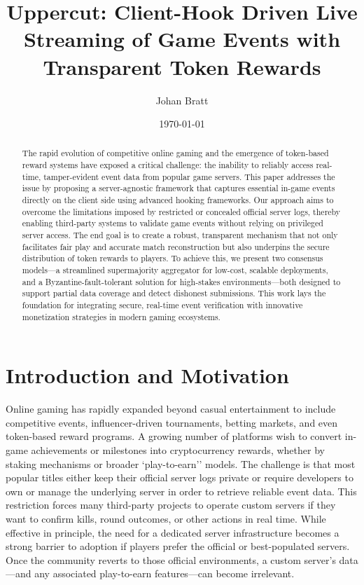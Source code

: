 \documentclass[11pt]{article}
\title{\textbf{Uppercut: Client-Hook Driven Live Streaming of Game Events with Transparent Token Rewards}}
\author{Johan Bratt}
\date{\today}
\begin{document}
\maketitle

\begin{abstract} The rapid evolution of competitive online gaming and the emergence of token-based reward systems have exposed a critical challenge: the inability to reliably access real-time, tamper-evident event data from popular game servers. This paper addresses the issue by proposing a server-agnostic framework that captures essential in-game events directly on the client side using advanced hooking frameworks. Our approach aims to overcome the limitations imposed by restricted or concealed official server logs, thereby enabling third-party systems to validate game events without relying on privileged server access. The end goal is to create a robust, transparent mechanism that not only facilitates fair play and accurate match reconstruction but also underpins the secure distribution of token rewards to players. To achieve this, we present two consensus models—a streamlined supermajority aggregator for low-cost, scalable deployments, and a Byzantine-fault-tolerant solution for high-stakes environments—both designed to support partial data coverage and detect dishonest submissions. This work lays the foundation for integrating secure, real-time event verification with innovative monetization strategies in modern gaming ecosystems.
\end{abstract}


\section{Introduction and Motivation}
\label{sec:intro}

Online gaming has rapidly expanded beyond casual entertainment to include competitive events, influencer-driven tournaments, betting markets, and even token-based reward programs. A growing number of platforms wish to convert in-game achievements or milestones into cryptocurrency    rewards\cite{erc1155}, whether by staking mechanisms or broader `play-to-earn''\cite{sahin2023} models. The challenge is that most popular titles either keep their official server logs private or require developers to own or manage the underlying server in order to retrieve reliable event data. This restriction forces many third-party projects to operate custom servers if they want to confirm kills, round outcomes, or other actions in real time. While effective in principle, the need for a dedicated server infrastructure becomes a strong barrier to adoption if players prefer the official or best-populated servers. Once the community reverts to those official environments, a custom server’s data—and any associated play-to-earn features—can become irrelevant.
\end{document}
